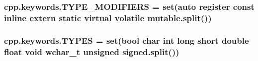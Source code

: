 \subsubsection[{\texorpdfstring{T\+Y\+P\+E\+\_\+\+M\+O\+D\+I\+F\+I\+E\+RS}{TYPE_MODIFIERS}}]{\setlength{\rightskip}{0pt plus 5cm}cpp.\+keywords.\+T\+Y\+P\+E\+\_\+\+M\+O\+D\+I\+F\+I\+E\+RS = set(\textquotesingle{}auto register const inline extern static virtual volatile mutable\textquotesingle{}.split())}\hypertarget{namespacecpp_1_1keywords_af9282ce418d6b4b43dca5ed574caedd7}{}\label{namespacecpp_1_1keywords_af9282ce418d6b4b43dca5ed574caedd7}
\subsubsection[{\texorpdfstring{T\+Y\+P\+ES}{TYPES}}]{\setlength{\rightskip}{0pt plus 5cm}cpp.\+keywords.\+T\+Y\+P\+ES = set(\textquotesingle{}bool char int long short double float void wchar\+\_\+t unsigned signed\textquotesingle{}.split())}\hypertarget{namespacecpp_1_1keywords_a56fd5baf357970548e1ec366edfc2c13}{}\label{namespacecpp_1_1keywords_a56fd5baf357970548e1ec366edfc2c13}
